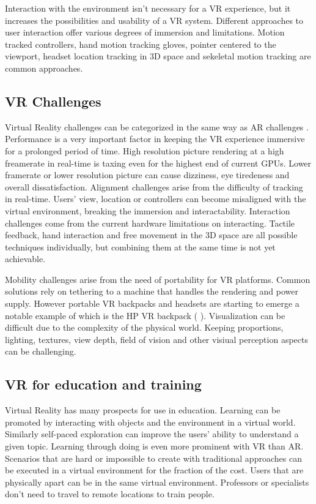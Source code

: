 \documentclass[12pt, a4paper,oneside, nocenter]{thesis}
\newcommand{\citeyeartitlexamkinline}[1]{(\usebibentry{#1}{title} \citeyear{#1})}
\begin{document}
\par
Interaction with the environment isn't necessary for a VR experience, but it increases the possibilities and usability of a VR system.
Different approaches to user interaction offer various degrees of immersion and limitations. Motion tracked controllers, hand motion tracking gloves, pointer centered to the viewport, headset location tracking in 3D space and sekeletal motion tracking are common approaches.
\subsection{VR Challenges}
Virtual Reality challenges can be categorized in the same way as AR challenges .
Performance is a very important factor in keeping the VR experience immersive for a prolonged period of time.
High resolution picture rendering at a high freamerate in real-time is taxing even for the highest end of current GPUs. 
Lower framerate or lower resolution picture can cause dizziness, eye tiredeness and overall dissatisfaction. Alignment challenges arise from the difficulty of tracking in real-time.
Users' view, location or controllers can become misaligned with the virtual environment, breaking the immersion and interactability.
Interaction challenges come from the current hardware limitations on interacting. Tactile feedback, hand interaction and free movement in the 3D space are all possible techniques individually, but combining them at the same time is not yet achievable.
\par %
Mobility challenges arise from the need of portability for VR platforms. Common solutions
rely on tethering to a machine that handles the rendering and power supply. However portable VR backpacks and headsets are starting to emerge a notable example of which is the HP VR backpack \citeyeartitlexamkinline{hp-vrbackpack}.
Visualization can be difficult due to the complexity of the physical world. Keeping proportions, lighting, textures, view depth, field of vision and other visiual perception aspects can be challenging.
\subsection{VR for education and training}
Virtual Reality has many prospects for use in education. Learning can be promoted by interacting with objects and the environment in a virtual world. 
Similarly self-paced exploration can improve the users' ability to understand a given topic.
Learning through doing is even more prominent with VR than AR. Scenarios that are hard or impossible to create with traditional approaches can be executed in a virtual environment for the fraction of the cost.
Users that are physically apart can be in the same virtual environment.
Professors or specialists don't need to travel to remote locations to train people.
\end{document}
